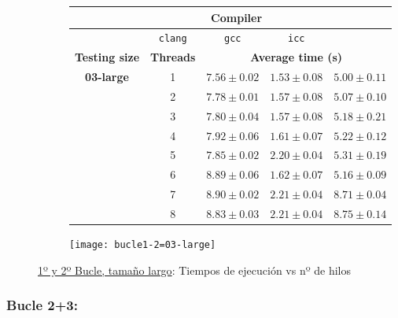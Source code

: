 \begin{figure}[H]
    \centering
    \begin{subfigure}{0.4\textwidth}
        \begin{adjustbox}{width=\textwidth} 
        \begin{tabular}{|c|c|c|c|c|}
            \hline
            \rowcolor{azul} \multicolumn{2}{|c|}{}&\multicolumn{3}{c|}{\textbf{Compiler}} \\ \hline
            \rowcolor{azul} \multicolumn{2}{|c|}{}&\texttt{clang}&\texttt{gcc}&\texttt{icc}\\ \hline
            \rowcolor{azul} \textbf{Testing size} & \textbf{Threads}&\multicolumn{3}{c|}{\textbf{Average time (s)}} \\ \hline
            \multirow{8}{1cm}{\textbf{03-large}} & 1 & \(7.56\pm{0.02}\) & \(1.53\pm{0.08}\) & \(5.00\pm{0.11}\) \\ \cline{2-5}
            & 2 & \(7.78\pm{0.01}\) & \(1.57\pm{0.08}\) & \(5.07\pm{0.10}\) \\ \cline{2-5}
            & 3 & \(7.80\pm{0.04}\) & \(1.57\pm{0.08}\) & \(5.18\pm{0.21}\) \\ \cline{2-5}
            & 4 & \(7.92\pm{0.06}\) & \(1.61\pm{0.07}\) & \(5.22\pm{0.12}\) \\ \cline{2-5}
            & 5 & \(7.85\pm{0.02}\) & \(2.20\pm{0.04}\) & \(5.31\pm{0.19}\) \\ \cline{2-5}
            & 6 & \(8.89\pm{0.06}\) & \(1.62\pm{0.07}\) & \(5.16\pm{0.09}\) \\ \cline{2-5}
            & 7 & \(8.90\pm{0.02}\) & \(2.21\pm{0.04}\) & \(8.71\pm{0.04}\) \\ \cline{2-5}
            & 8 & \(8.83\pm{0.03}\) & \(2.21\pm{0.04}\) & \(8.75\pm{0.14}\) \\ \hline
        \end{tabular}
        \end{adjustbox}
    \end{subfigure}
    \hfill
    \begin{subfigure}{0.5\textwidth}
        \texttt{[image: bucle1-2=03-large]}
    \end{subfigure}
    \caption{\underline{1º y 2º Bucle, tamaño largo}: Tiempos de ejecución vs nº de hilos}
    \label{bucle1-2=03-large}
\end{figure}

\subsubsection{\textbf{Bucle 2+3:}}

